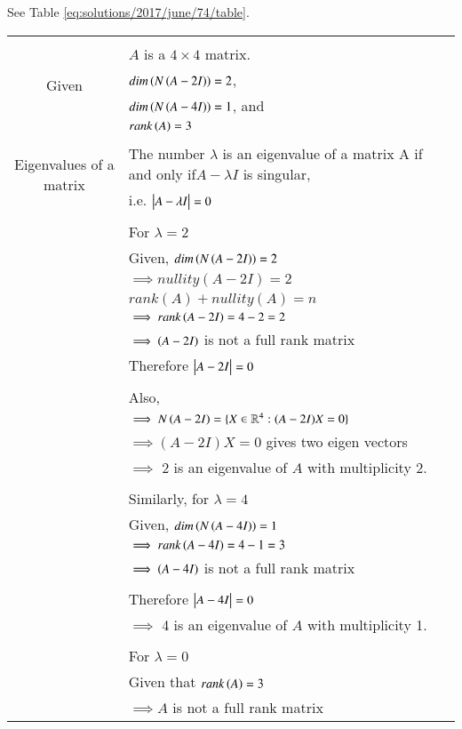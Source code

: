 See Table \ref{eq:solutions/2017/june/74/table}.

%
\begin{longtable}{|c|l|}
    \hline
	\multirow{5}{*}{Given} 
	& \\
	& $A$ is a $4\times 4$ matrix.\\
	& $dim\left(N\left(A-2I\right)\right)=2$,\\
	& $dim\left(N\left(A-4I\right)\right)=1$, and\\
	& $rank\left(A\right)=3$\\
	\hline
	\multirow{3}{*}{Eigenvalues of a matrix} 
	&\\
	& The number $\lambda$ is an eigenvalue of a matrix A if and only if$A-\lambda I$ is singular,\\
	& i.e. $\begin{vmatrix}A-\lambda I\end{vmatrix}=0$ \\
	&\\
	& For $\lambda=2$\\
	& Given, $dim\left(N\left(A-2I\right)\right)=2$\\
	& $\implies nullity(A-2I)=2$\\
	& $rank(A)+nullity(A)=n$\\
	& $\implies rank\left(A-2I\right)=4-2=2$\\
	& $\implies \left(A-2I\right)$ is not a full rank matrix\\
	& Therefore $\begin{vmatrix}A-2I\end{vmatrix}=0$\\
	&\\
	& Also,\\
	& $\implies N\left(A-2I\right)=\{X\in \mathbb{R}^4:(A-2I)X=0\}$ \\
	& $\implies (A-2I)X=0$ gives two eigen vectors\\
	& $\implies$ 2 is an eigenvalue of $A$ with multiplicity 2.\\
	&\\
	& Similarly, for $\lambda=4$\\
	& Given, $dim\left(N\left(A-4I\right)\right)=1$\\
	& $\implies rank\left(A-4I\right)=4-1=3$\\
	& $\implies \left(A-4I\right)$ is not a full rank matrix\\
	\hline \newpage \hline 
	&\\
	& Therefore $\begin{vmatrix}A-4I\end{vmatrix}=0$\\
	& $\implies$ 4 is an eigenvalue of $A$ with multiplicity 1.\\
	&\\
	& For $\lambda=0$\\
	& Given that $rank\left(A\right)=3$\\
	& $\implies A$ is not a full rank matrix\\

\end{longtable}
